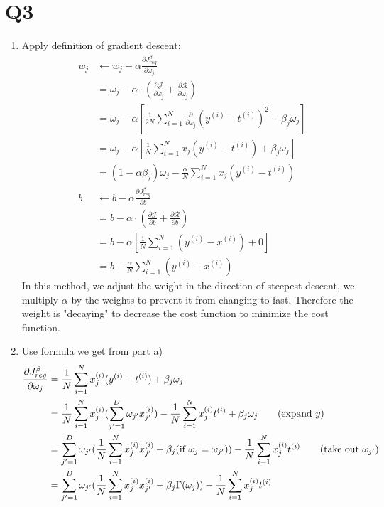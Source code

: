 \documentclass[12pt]{article}
\begin{document}
	\section*{Q3}
	\begin{enumerate}[label=\alph*)]
		\item Apply definition of gradient descent: 
		\begin{align*}
			w_j &\leftarrow w_j-\alpha\frac{\partial J^\beta_{reg}}{\partial\omega_j}\\
			&=\omega_j-\alpha\cdot(\frac{\partial\mathcal{J}}{\partial\omega_j}+\frac{\partial\mathcal{R}}{\partial\omega_j})\\
			&=\omega_j-\alpha[\frac{1}{2N}\sum^N_{i=1}\frac{\partial}{\partial\omega_j}(y^{(i)}-t^{(i)})^2+\beta_j\omega_j]\\
			&=\omega_j-\alpha[\frac{1}{N}\sum_{i=1}^Nx_j(y^{(i)}-t^{(i)})+\beta_j\omega_j]\\
			&=(1-\alpha\beta_j)\omega_j-\frac{\alpha}{N}\sum_{i=1}^Nx_j(y^{(i)}-t^{(i)})\\
			b &\leftarrow b-\alpha\frac{\partial J^\beta_{reg}}{\partial b}\\
			&=b-\alpha\cdot(\frac{\partial\mathcal{J}}{\partial b}+\frac{\partial\mathcal{R}}{\partial b})\\
			&=b-\alpha[\frac{1}{N}\sum_{i=1}^N(y^{(i)}-x^{(i)})+0]\\
			&=b-\frac{\alpha}{N}\sum_{i=1}^N(y^{(i)}-x^{(i)})
		\end{align*}
		In this method, we adjust the weight in the direction of steepest descent, we multiply $\alpha$ by the weights to prevent it from changing to fast. Therefore the weight is "decaying" to decrease the cost function to minimize the cost function.
		\item Use formula we get from part a)\begin{align*}
			\frac{\partial J^\beta_{reg}}{\partial\omega_j}&=\frac{1}{N}\sum^N_{i=1}x_j^{(i)}(y^{(i)}-t^{(i)})+\beta_j\omega_j\\
			&=\frac{1}{N}\sum_{i=1}^Nx_j^{(i)}(\sum^D_{j'=1}\omega_{j'}x_{j'}^{(i)})-\frac{1}{N}\sum_{i=1}^Nx_j^{(i)}t^{(i)}+\beta_j\omega_j\tag{\text{expand }$y$}\\
			&=\sum_{j'=1}^D\omega_{j'}(\frac{1}{N}\sum_{i=1}^Nx_j^{(i)}x_{j'}^{(i)}+\beta_j(\text{if $\omega_j=\omega_{j'}$}))-\frac{1}{N}\sum_{i=1}^Nx_j^{(i)}t^{(i)}\tag{take out $\omega_{j'}$}\\
			&=\sum_{j'=1}^D\omega_{j'}(\frac{1}{N}\sum_{i=1}^Nx_j^{(i)}x_{j'}^{(i)}+\beta_j\Gamma(\omega_j))-\frac{1}{N}\sum_{i=1}^Nx_j^{(i)}t^{(i)}

\end{align*}
\end{enumerate}
\end{document}
